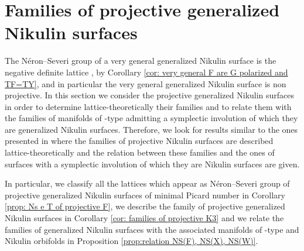 \documentclass{amsart}
\makeatletter
\theoremstyle{definition}
\numberwithin{equation}{section}
\numberwithin{equation}{section} \theoremstyle{definition}
\newcounter{mathrecordid}
\newcommand{\mathboxbegin}[1]{%
  \stepcounter{mathrecordid}%
  \immediate\write\mathrecords{\themathrecordid,#1}%
  \special{pdf:bann << /Type /Annot /Subtype /Link /Border [0 0 0]
    /MathBoxID \themathrecordid /F 2
    /A << /S /URI /URI (urn:mathbox:\themathrecordid) >> >>}}
\newcommand{\mathboxinlineplain}[1]{$#1$}
\newcommand{\mathboxinline}[1]{%
  $\mathboxbegin{inline}#1\special{pdf:eann}$}
\newcommand{\recordmath}{%
  \ifmeasuring@\expandafter\mathboxinlineplain
  \else\expandafter\mathboxinline\fi}
\makeatother
\begin{document}
\section{Families of projective generalized Nikulin surfaces}\label{Families of projective generalized Nikulin surfaces}\label{section: Families of projective generalized Nikulin surfaces}
The N\'eron--Severi group of a very general generalized Nikulin surface is the negative definite lattice \recordmath{E_7(-2)}, by Corollary \ref{cor: very general F are G polarized and TF=TY}, and in particular the very general generalized Nikulin surface is non projective. In this section we consider the projective generalized Nikulin surfaces in order to determine lattice-theoretically  their families and to relate them with the families of manifolds of \recordmath{K3^{[2]}}-type admitting a symplectic involution of which they are generalized Nikulin surfaces. 
Therefore, we look for results similar to the ones presented in \cite[Section 2]{GS} where the families of projective Nikulin surfaces are described lattice-theoretically and the relation between these families and the ones of  \recordmath{K3} surfaces with a symplectic involution of which they are Nikulin surfaces are given. 

In particular, we classify all the lattices which appear as N\'eron--Severi group of projective generalized Nikulin surfaces of minimal Picard number in Corollary \ref{prop: Ns e T of projective F}, we describe the family of projective generalized Nikulin surfaces in Corollary \ref{cor: families of projective K3} and we relate the families of generalized Nikulin surfaces with the associated manifolds of \recordmath{K3^{[2]}}-type and Nikulin orbifolds in Proposition \ref{prop:relation NS(F), NS(X), NS(W)}. 
\end{document}
